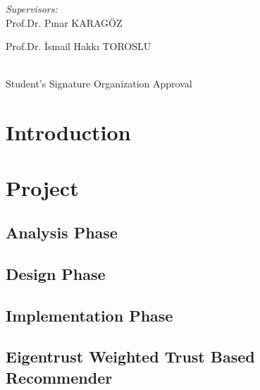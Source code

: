 \documentclass[12pt]{article}
\begin{document}
\begin{titlepage}
\begin{minipage}{0.4\textwidth}
			
		\end{minipage}
		\begin{minipage}{0.4\textwidth}
			\begin{flushright} \large
				\emph{Supervisors:} \\
				Prof.Dr. Pınar KARAGÖZ \\
			\end{flushright}
			\begin{flushright} \large
				Prof.Dr. İsmail Hakkı TOROSLU \\
			\end{flushright}
		\end{minipage}\\[1cm]
		\vspace{2cm}
		Student's Signature \hspace{150px} Organization Approval \\
	\end{titlepage}
	
	\begingroup
	\hypersetup{hidelinks}
	\tableofcontents
	\endgroup
          
	\newpage
	
	\section{Introduction}
	

	\section{Project}
	

	\subsection{Analysis Phase}
	
	
	\subsection{Design Phase}
	
	
	\subsection{Implementation Phase}
	
	
	\subsection{Eigentrust Weighted Trust Based Recommender}
	
	
\end{document}
